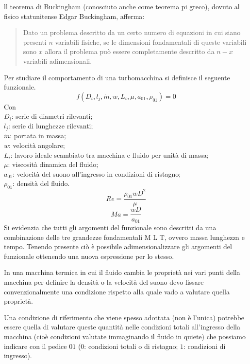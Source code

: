 ll teorema di Buckingham (conosciuto anche come teorema pi greco), dovuto al fisico statunitense Edgar Buckingham, afferma:
\begin{quotation}
	Dato un problema descritto da un certo numero di equazioni in cui siano presenti $n$ variabili fisiche, se le dimensioni fondamentali di queste variabili sono $x$ allora il problema può essere completamente descritto da $n - x$ variabili adimensionali.
\end{quotation}
Per studiare il comportamento di una turbomacchina si definisce il seguente funzionale.
\begin{equation}
f(D_i,l_j,\dot{m},w,L_i,\mu,a_{01},\rho_{01})=0
\end{equation}
Con\\
$D_i$: serie di diametri rilevanti;\\
$l_j$: serie di lunghezze rilevanti;\\
$\dot{m}$: portata in massa;\\
$w$: velocità angolare;\\
$L_i$: lavoro ideale scambiato tra macchina e fluido per unità di massa;\\
$\mu$: viscosità dinamica del fluido;\\
$a_{01}$: velocità del suono all'ingresso in condizioni di ristagno;\\
$\rho_{01}$: densità del fluido.
\begin{equation}
Re= \frac{\rho_{01} w D^2}{\mu}
\end{equation}
\begin{equation}
Ma= \frac{w D}{a_{01}}
\end{equation}
Si evidenzia che tutti gli argomenti del funzionale sono descritti da una combinazione delle tre grandezze fondamentali M L T, ovvero massa lunghezza e tempo. Tenendo presente ciò è possibile adimensionalizzare gli argomenti del funzionale ottenendo una nuova espressione per lo stesso.

In una macchina termica in cui il fluido cambia le proprietà nei vari punti della macchina per definire la densità o la velocità del suono devo fissare
convenzionalmente una condizione rispetto alla quale vado a valutare quella
proprietà. 

Una condizione di riferimento che viene spesso adottata (non è
l’unica) potrebbe essere quella di valutare queste quantità nelle condizioni
totali all’ingresso della macchina (cioè condizioni valutate immaginando il fluido in quiete) che possiamo indicare con il pedice $01$ ($0$: condizioni totali o di ristagno; $1$: condizioni di ingresso).

